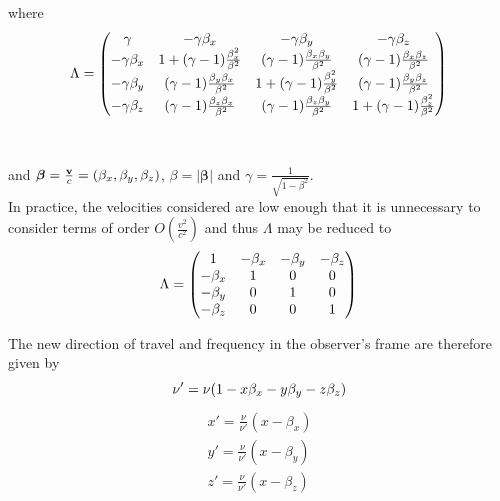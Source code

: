\noindent where 
\begin{equation}
{\Lambda}=
\begin{pmatrix} 
\gamma & -\gamma \beta_x & -\gamma \beta_y & -\gamma \beta_z \\
-\gamma \beta_x & 1+(\gamma-1)\frac{\beta_x^2}{\beta^2} & 
(\gamma-1)\frac{\beta_x \beta_y}{\beta^2} & (\gamma-1)\frac{\beta_x \beta_z}{\beta^2} \\
-\gamma \beta_y  & (\gamma-1)\frac{\beta_y \beta_x}{\beta^2} & 1+(\gamma-1)\frac{\beta_y^2}{\beta^2} 
& (\gamma-1)\frac{\beta_y \beta_z}{\beta^2}\\
-\gamma \beta_z & (\gamma-1)\frac{\beta_z \beta_x}{\beta^2} & (\gamma-1)\frac{\beta_z \beta_y}{\beta^2} 
& 1+(\gamma-1)\frac{\beta_z^2}{\beta^2} \\
\end{pmatrix}
\\
\end{equation}
\\
\\
\noindent and $\boldsymbol{\beta}=\frac{{\bf{v}}}{c}=(\beta_x,\beta_y,\beta_z)$,   $\beta=\lvert \boldsymbol{\beta}\rvert$ and $\gamma = \frac{1}{\sqrt{1-\beta^2}}$.
\\

In practice, the velocities considered are low enough that it is unnecessary to consider terms of order $O(\frac{v^2}{c^2})$ and thus ${\Lambda}$ may be reduced to
\begin{equation}
{\Lambda}=
\begin{pmatrix} 
1 & - \beta_x & - \beta_y & - \beta_z \\
- \beta_x & 1 & 0 & 0 \\
- \beta_y  & 0 & 1 & 0\\
- \beta_z & 0 & 0 & 1 \\
\end{pmatrix}
\\
\end{equation}

\noindent The new direction of travel and frequency in the observer's frame are therefore given by  
\begin{equation}
\nu'=\nu(1-x\beta_x-y\beta_y-z\beta_z) \\
\end{equation}
\begin{equation*}
\begin{split}
x'=\frac{\nu}{\nu'}(x-\beta_x) \\
y'=\frac{\nu}{\nu'}(x-\beta_y) \\
z'=\frac{\nu}{\nu'}(x-\beta_z) \\
\end{split}
\end{equation*}

